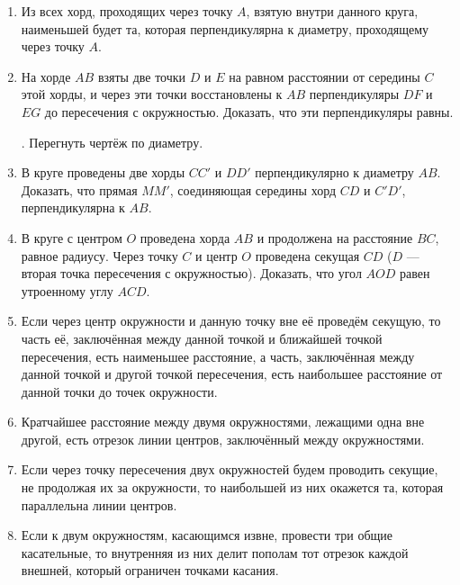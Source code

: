 \documentclass[oneside]{book}
\begin{document}
\begin{center}
\end{center}

\begin{enumerate}[resume]


 \item
Из всех хорд, проходящих через точку $A$, взятую внутри данного круга, наименьшей будет та, которая перпендикулярна к диаметру, проходящему через точку $A$.

 \item
На хорде $AB$ взяты две точки $D$ и $E$ на равном расстоянии от середины $C$ этой хорды, и через эти точки восстановлены к $AB$ перпендикуляры $DF$ и $EG$ до пересечения с окружностью.
Доказать, что эти перпендикуляры равны.

\smallskip
{}.
Перегнуть чертёж по диаметру.

 \item
В круге проведены две хорды $CC'$ и $DD'$ перпендикулярно к диаметру $AB$.
Доказать, что прямая $MM'$, соединяющая середины хорд $CD$ и $C'D'$, перпендикулярна к $AB$.

 \item
В круге с центром $O$ проведена хорда $AB$ и продолжена на расстояние $BC$, равное радиусу.
Через точку $C$ и центр $O$ проведена секущая $CD$ ($D$ — вторая точка пересечения с окружностью).
Доказать, что угол $AOD$ равен утроенному углу $ACD$.

 \item
Если через центр окружности и данную точку вне её проведём секущую, то часть её, заключённая между данной точкой и ближайшей точкой пересечения, есть наименьшее расстояние, а часть, заключённая между данной точкой и другой точкой пересечения, есть наибольшее расстояние от данной точки до точек окружности.

 \item
Кратчайшее расстояние между двумя окружностями, лежащими одна вне другой, есть отрезок линии центров, заключённый между окружностями.

 \item
Если через точку пересечения двух окружностей будем проводить секущие, не продолжая их за окружности, то наибольшей из них окажется та, которая параллельна линии центров.

 \item
Если к двум окружностям, касающимся извне, провести три общие касательные, то внутренняя из них делит пополам тот отрезок каждой внешней, который ограничен точками касания.


\end{enumerate}
\end{document}
